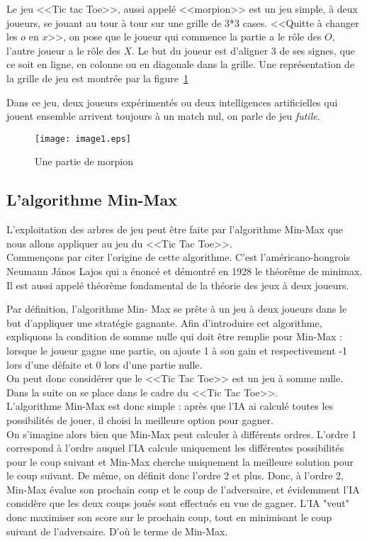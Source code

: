 \documentclass{article}
\begin{document}
Le jeu <<Tic tac Toe>>, aussi appelé <<morpion>> est un jeu simple, à deux joueurs, se jouant au tour à tour sur une grille de 3*3 cases.
<<Quitte à changer les $o$ en $x$>>, on pose que le joueur qui commence la partie a le rôle des $O$, l'autre joueur a le rôle des $X$.
Le but du joueur est d'aligner 3 de ses signes, que ce soit en ligne, en colonne ou en diagonale dans la grille. Une représentation de la grille de jeu est montrée par la figure~\ref{grille}

Dans ce jeu, deux joueurs expérimentés ou deux intelligences artificielles qui jouent ensemble arrivent toujours à un match
nul, on parle de jeu \emph{futile}.

\begin{figure}[!h]
\centering
\texttt{[image: image1.eps]}
\caption{Une partie de morpion}
\label{grille}
\end{figure}


\subsection{L'algorithme Min-Max}

L'exploitation des arbres de jeu peut être faite par l'algorithme Min-Max
que nous allons appliquer au jeu du <<Tic Tac Toe>>. \\

Commençons par citer l'origine de cette algorithme. C'est l'américano-hongrois Neumann János Lajos qui a énoncé et démontré en 1928 le théorême de minimax. Il est aussi appelé théorème fondamental de la théorie des jeux à deux joueurs.

Par définition, l'algorithme Min-
Max se prête à un jeu à deux joueurs dans le but d'appliquer une stratégie
gagnante.
Afin d'introduire cet algorithme, expliquons la condition de somme nulle qui
doit être remplie pour Min-Max :
lorsque le joueur gagne une partie, on ajoute 1 à son gain et respectivement -1
lors
d'une défaite et 0 lors d'une partie nulle. \\

On peut donc considérer que le <<Tic Tac Toe>> est un jeu à somme nulle.
Dans la suite on se place dans le cadre du <<Tic Tac Toe>>. \\

L'algorithme Min-Max est donc simple : après que l'IA ai calculé toutes les
possibilités de jouer,
 il choisi la meilleure option pour gagner. \\

On s'imagine alors bien que Min-Max peut calculer à différents ordres. L'ordre 1
correspond à l'ordre auquel
l'IA calcule uniquement les différentes possibilités pour le coup suivant et
Min-Max cherche uniquement
la meilleure solution pour le coup suivant. De même, on définit donc l'ordre 2
et plus.
Donc, à l'ordre 2, Min-Max évalue son prochain coup et le coup de l'adversaire,
et évidemment
l'IA considère que les deux coups joués sont effectués en vue de gagner. L'IA
"veut" donc
maximiser son score sur le prochain coup, tout en minimisant le coup suivant de
l'adversaire.
D'où le terme de Min-Max.
\end{document}
